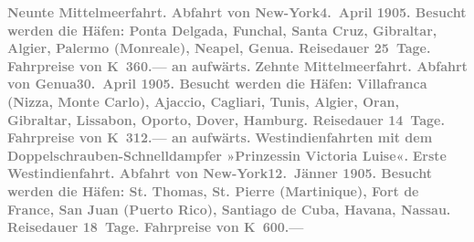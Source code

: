 {\begin{ledgroupsized}[t]{13cm}
           \noindent{}\textcolor{gray}{\textbf{\textbf{Neunte Mittelmeerfahrt.}
                  Abfahrt von New-York\textbf{4. April 1905}. Besucht werden die Häfen: Ponta Delgada,
                     Funchal, Santa
                     Cruz, Gibraltar, Algier, Palermo (Monreale), Neapel, Genua. Reisedauer 25 Tage.
                  Fahrpreise von \textbf{K 360.—} an aufwärts.}}\pend
           \pstart
           \textcolor{gray}{\textbf{\textbf{Zehnte Mittelmeerfahrt.}
                  Abfahrt von Genua\textbf{30. April 1905}. Besucht werden die Häfen: Villafranca
                     (Nizza, Monte
                     Carlo), Ajaccio, Cagliari, Tunis, Algier, Oran,
                     Gibraltar, Lissabon, Oporto, Dover, Hamburg. Reisedauer
                  14 Tage. Fahrpreise von \textbf{K 312.—} an aufwärts.}}\pend
           {\bigskip}\pstart
           \noindent{}\centering{}\textcolor{gray}{\textbf{Westindienfahrten mit dem Doppelschrauben-Schnelldampfer
                  »Prinzessin Victoria Luise«.}}\pend
           \pstart
           \noindent{}\textcolor{gray}{\textbf{\textbf{Erste Westindienfahrt.} Abfahrt von New-York\textbf{12. Jänner 1905}. Besucht werden die Häfen: St. Thomas,
                     St. Pierre (Martinique), Fort de France, San Juan
                     (Puerto Rico), Santiago de Cuba, Havana, Nassau. Reisedauer 18 Tage. Fahrpreise von \textbf{K 600.—}
}}
\end{ledgroupsized}}
